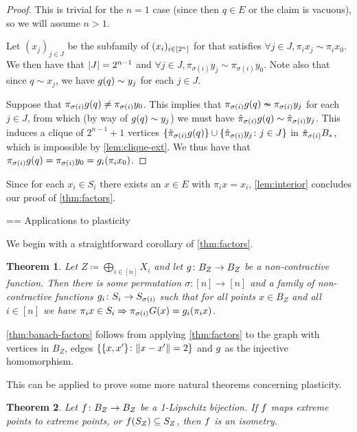 \documentclass{amsart}
\newtheorem{theorem}{Theorem}[section]
\theoremstyle{definition}
\begin{document}
\begin{proof} 

  This is trivial for the $n=1$ case (since then $q \in E$ or the claim is vacuous), so we will assume $n > 1$.

  Let $(x_j)_{j \in J}$ be the subfamily of $(x_i)_{i \in [2^n]}$ for that satisfies $\forall j \in J, \pi_i x_j \sim \pi_i x_0$. We then have that $\abs{J} = 2^{n-1}$ and $\forall j \in J, \pi_{\sigma(i)}y_j \sim \pi_{\sigma(i)} y_0$. Note also that since $q \sim x_j$, we have $g(q) \sim y_j$ for each $j \in J$.

  Suppose that $\pi_{\sigma(i)} g(q) \neq \pi_{\sigma(i)} y_0$. This implies that $\pi_{\sigma(i)}g(q) \nsim \pi_{\sigma(i)}y_j$ for each $j \in J$, from which (by way of $g(q) \sim y_j$) we must have $\hat{\pi}_{\sigma(i)}g(q) \sim \hat{\pi}_{\sigma(i)}y_j$. This induces a clique of $2^{n-1}+1$ vertices $\{\hat{\pi}_{\sigma(i)}g(q)\} \cup \{\hat{\pi}_{\sigma(i)}y_j  \colon  j \in J\}$ in $\hat{\pi}_{\sigma(i)}B_*$, which is impossible by \autoref{lem:clique-ext}. We thus have that $\pi_{\sigma(i)} g(q) = \pi_{\sigma(i)}y_0 = g_i (\pi_i x_0)$.
\end{proof}
 

Since for each $x_i \in S_i$ there exists an $x \in E$ with $\pi_i x = x_i$, \autoref{lem:interior} concludes our proof of  \autoref{thm:factors}.


== Applications to plasticity

We begin with a straightforward corollary of  \autoref{thm:factors}.

\begin{theorem} \label{thm:banach-factors}
\annotation  Let $Z \coloneqq \bigoplus_{i \in [n]} X_i$ and let $g \colon B_Z \to B_Z$ be a non-contractive function. Then there is some permutation $\sigma \colon [n] \to [n]$ and a family of non-contractive functions $g_i \colon S_i \to S_{\sigma(i)}$ such that for all points $x \in B_Z$ and all $i \in [n]$ we have 
  $\pi_i x \in S_i \Rightarrow \pi_{\sigma(i)} G(x) = g_i (\pi_i x)$.
\end{theorem}

\autoref{thm:banach-factors} follows from applying  \autoref{thm:factors} to the graph with vertices in $B_Z$, edges $\{\{x,x'\} \colon \norm{x-x'}=2\}$ and $g$ as the injective homomorphism.

This can be applied to prove some more natural theorems concerning plasticity.

\begin{theorem} \label{thm:natural}
\annotation
  Let $f\colon B_Z \to B_Z$ be a 1-Lipschitz bijection. If $f$ maps extreme points to extreme points, or $f(S_Z) \subseteq S_Z$, then $f$ is an isometry.
\end{theorem}
\end{document}
